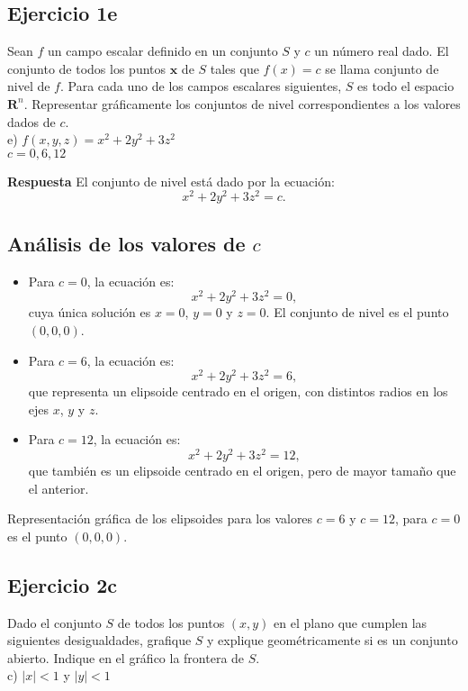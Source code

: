 \documentclass{report}
\begin{document}
    \subsection*{Ejercicio 1e}
    Sean $f$ un campo escalar definido en un conjunto $S$ y $c$ un número real dado. El conjunto de todos los puntos $\boldsymbol{x}$ de $S$ tales que $f(x)=c$ se llama conjunto de nivel de $f$. Para cada uno de los campos escalares siguientes, $S$ es todo el espacio $\mathbf{R}^{n}$. Representar gráficamente los conjuntos de nivel correspondientes a los valores dados de $c$.\\
    e) $f(x, y, z)=x^{2}+2 y^{2}+3 z^{2}$\\
    $c = 0, 6, 12$

    \textbf{Respuesta}
    El conjunto de nivel está dado por la ecuación:
    \[
    x^2 + 2y^2 + 3z^2 = c.
    \]

    \subsection*{Análisis de los valores de $c$}

    \begin{itemize}
        \item Para $c = 0$, la ecuación es:
        \[
        x^2 + 2y^2 + 3z^2 = 0,
        \]
        cuya única solución es $x = 0$, $y = 0$ y $z = 0$. El conjunto de nivel es el punto $(0, 0, 0)$.

        \item Para $c = 6$, la ecuación es:
        \[
        x^2 + 2y^2 + 3z^2 = 6,
        \]
        que representa un elipsoide centrado en el origen, con distintos radios en los ejes $x$, $y$ y $z$.

        \item Para $c = 12$, la ecuación es:
        \[
        x^2 + 2y^2 + 3z^2 = 12,
        \]
        que también es un elipsoide centrado en el origen, pero de mayor tamaño que el anterior.
    \end{itemize}

    Representación gráfica de los elipsoides para los valores $c = 6$ y $c = 12$, para $c=0$ es el punto $(0,0,0)$.
    \begin{figure}[h]
    \centering
    \end{figure}

    \newpage\subsection*{Ejercicio 2c}
    Dado el conjunto $S$ de todos los puntos $(x, y)$ en el plano que cumplen las siguientes desigualdades, grafique $S$ y explique geométricamente si es un conjunto abierto. Indique en el gráfico la frontera de $S$.\\
    c) $|x|<1$ y $|y|<1$
\end{document}
